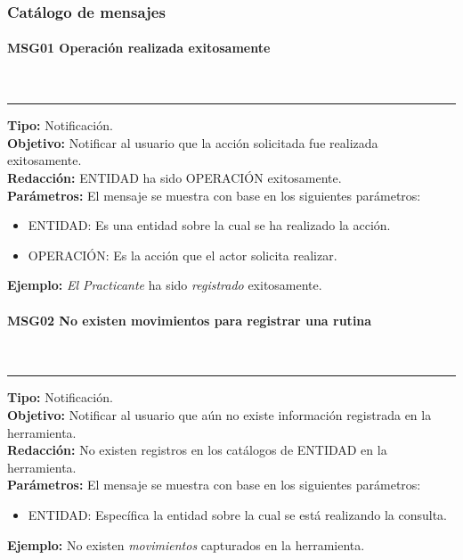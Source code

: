 \subsubsection{Catálogo de mensajes}
\label{sec:mensajes}

\paragraph{\textcolor[rgb]{0, 0, 0.545098}{MSG01 Operación realizada exitosamente}} \hspace{1cm} \\
\label{msj:MSG01}
\rule[3mm]{16.59cm}{0.1mm} \vspace{1mm}
\textbf{Tipo:} Notificación.\\
\textbf{Objetivo:} Notificar al usuario que la acción solicitada fue realizada exitosamente.\\
\textbf{Redacción:} ENTIDAD ha sido OPERACIÓN exitosamente.\\
\textbf{Parámetros:} El mensaje se muestra con base en los siguientes parámetros:
\begin{itemize} \itemsep1pt \parskip0pt 
	\item ENTIDAD: Es una entidad sobre la cual se ha realizado  la acción.
	\item OPERACIÓN: Es la acción que el actor solicita realizar.
\end{itemize}
\textbf{Ejemplo:} \textit{El Practicante} ha sido \textit{registrado} exitosamente.\\

\paragraph{\textcolor[rgb]{0, 0, 0.545098}{MSG02 No existen movimientos para registrar una rutina}} \hspace{1cm} \\
\label{msj:MSG02}
\rule[3mm]{16.59cm}{0.1mm} \vspace{1mm}
\textbf{Tipo:} Notificación.\\
\textbf{Objetivo:} Notificar al usuario que aún no existe información registrada en la herramienta.\\
\textbf{Redacción:} No existen registros en los catálogos de ENTIDAD en la herramienta.\\
\textbf{Parámetros:} El mensaje se muestra con base en los siguientes parámetros:
\begin{itemize} \itemsep1pt \parskip0pt 
	\item ENTIDAD: Específica la entidad sobre la cual se está realizando la consulta.
\end{itemize}
\textbf{Ejemplo:} No existen \textit{movimientos} capturados en la herramienta.\\

